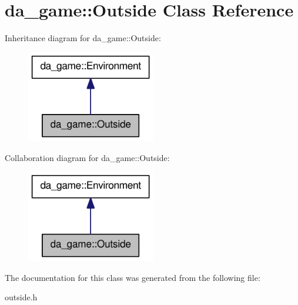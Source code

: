 \hypertarget{classda__game_1_1Outside}{
\section{da\_\-game::Outside Class Reference}
\label{classda__game_1_1Outside}
}
Inheritance diagram for da\_\-game::Outside:\nopagebreak
\begin{figure}[H]
\begin{center}
\leavevmode
\includegraphics[width=160pt]{classda__game_1_1Outside__inherit__graph}
\end{center}
\end{figure}
Collaboration diagram for da\_\-game::Outside:\nopagebreak
\begin{figure}[H]
\begin{center}
\leavevmode
\includegraphics[width=160pt]{classda__game_1_1Outside__coll__graph}
\end{center}
\end{figure}


The documentation for this class was generated from the following file:\begin{DoxyCompactItemize}
\item 
outside.h\end{DoxyCompactItemize}
